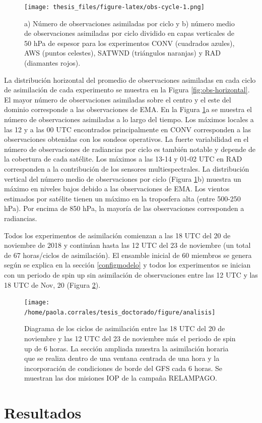 \documentclass[12pt,oneside]{reedthesis}
\begin{document}
\begin{figure}
\centering
\texttt{[image: thesis\_files/figure-latex/obs-cycle-1.png]}
\caption{\label{fig:obs-cycle}a) Número de observaciones asimiladas por ciclo y b) número medio de observaciones asimiladas por ciclo dividido en capas verticales de 50 hPa de espesor para los experimentos CONV (cuadrados azules), AWS (puntos celestes), SATWND (triángulos naranjas) y RAD (diamantes rojos).}
\end{figure}
La distribución horizontal del promedio de observaciones asimiladas en cada ciclo de asimilación de cada experimento se muestra en la Figura \ref{fig:obs-horizontal}. El mayor número de observaciones asimiladas sobre el centro y el este del dominio corresponde a las observaciones de EMA. En la Figura \ref{fig:obs-cycle}a se muestra el número de observaciones asimiladas a lo largo del tiempo. Los máximos locales a las 12 y a las 00 UTC encontrados principalmente en CONV corresponden a las observaciones obtenidas con los sondeos operativos. La fuerte variabilidad en el número de observaciones de radiancias por ciclo es también notable y depende de la cobertura de cada satélite. Los máximos a las 13-14 y 01-02 UTC en RAD corresponden a la contribución de los sensores multiespectrales. La distribución vertical del número medio de observaciones por ciclo (Figura \ref{fig:obs-cycle}b) muestra un máximo en niveles bajos debido a las observaciones de EMA. Los vientos estimados por satélite tienen un máximo en la troposfera alta (entre 500-250 hPa). Por encima de 850 hPa, la mayoría de las observaciones corresponden a radiancias.

Todos los experimentos de asimilación comienzan a las 18 UTC del 20 de noviembre de 2018 y continúan hasta las 12 UTC del 23 de noviembre (un total de 67 horas/ciclos de asimilación). El ensamble inicial de 60 miembros se genera según se explica en la sección \ref{configmodelo} y todos los experimentos se inician con un periodo de spin up sin asimilación de observaciones entre las 12 UTC y las 18 UTC de Nov, 20 (Figura \ref{fig:cycle}).


\begin{figure}
\texttt{[image: /home/paola.corrales/tesis\_doctorado/figure/analisis]} \caption{Diagrama de los ciclos de asimilación entre las 18 UTC del 20 de noviembre y las 12 UTC del 23 de noviembre más el periodo de spin up de 6 horas. La sección ampliada muestra la asimilación horaria que se realiza dentro de una ventana centrada de una hora y la incorporación de condiciones de borde del GFS cada 6 horas. Se muestran las dos misiones IOP de la campaña RELAMPAGO.}\label{fig:cycle}
\end{figure}
\hypertarget{resultados}{%
\section{Resultados}\label{resultados}}
\end{document}
